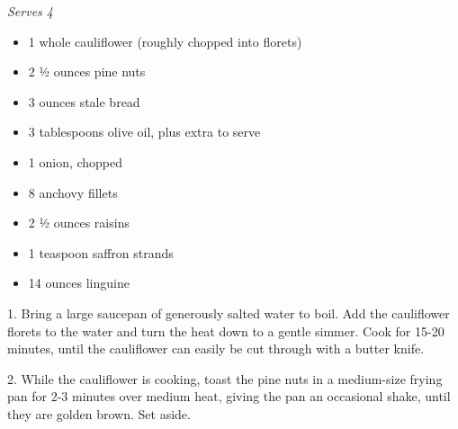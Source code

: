 \emph{Serves 4}

\begin{itemize}
\tightlist
\item
  1 whole cauliflower (roughly chopped into florets)
\end{itemize}

\begin{itemize}
\tightlist
\item
  2 ½ ounces pine nuts
\end{itemize}

\begin{itemize}
\tightlist
\item
  3 ounces stale bread
\end{itemize}

\begin{itemize}
\tightlist
\item
  3 tablespoons olive oil, plus extra to serve
\end{itemize}

\begin{itemize}
\tightlist
\item
  1 onion, chopped
\end{itemize}

\begin{itemize}
\tightlist
\item
  8 anchovy fillets
\end{itemize}

\begin{itemize}
\tightlist
\item
  2 ½ ounces raisins
\end{itemize}

\begin{itemize}
\tightlist
\item
  1 teaspoon saffron strands
\end{itemize}

\begin{itemize}
\tightlist
\item
  14 ounces linguine
\end{itemize}

1. Bring a large saucepan of generously salted water to boil. Add the
cauliflower florets to the water and turn the heat down to a gentle
simmer. Cook for 15-20 minutes, until the cauliflower can easily be cut
through with a butter knife.

2. While the cauliflower is cooking, toast the pine nuts in a
medium-size frying pan for 2-3 minutes over medium heat, giving the pan
an occasional shake, until they are golden brown. Set aside.

